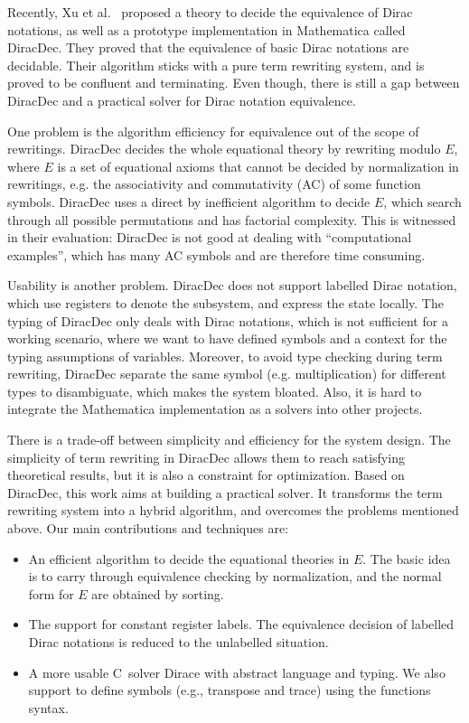 \documentclass[runningheads]{llncs}
\newcommand{\CC}{C\nolinebreak\hspace{-.05em}\raisebox{.4ex}{\tiny\bf +}\nolinebreak\hspace{-.10em}\raisebox{.4ex}{\tiny\bf +}}
\def\CC{{C\nolinebreak[4]\hspace{-.05em}\raisebox{.4ex}{\tiny\bf ++}}}
\begin{document}
Recently, Xu et al.~\cite{diracdec} proposed a theory to decide the equivalence of Dirac notations, as well as a prototype implementation in Mathematica called DiracDec.
They proved that the equivalence of basic Dirac notations are decidable.
Their algorithm sticks with a pure term rewriting system, and is proved to be confluent and terminating.
Even though, there is still a gap between DiracDec and a practical solver for Dirac notation equivalence.

One problem is the algorithm efficiency for equivalence out of the scope of rewritings. DiracDec decides the whole equational theory by rewriting modulo $E$, where $E$ is a set of equational axioms that cannot be decided by normalization in rewritings, e.g. the associativity and commutativity (AC) of some function symbols. DiracDec uses a direct by inefficient algorithm to decide $E$, which search through all possible permutations and has factorial complexity.
This is witnessed in their evaluation: DiracDec is not good at dealing with ``computational examples'', which has many AC symbols and are therefore time consuming.

Usability is another problem.
DiracDec does not support labelled Dirac notation, which use registers to denote the subsystem, and express the state locally.
The typing of DiracDec only deals with Dirac notations, which is not sufficient for a working scenario, where we want to have defined symbols and a context for the typing assumptions of variables.
Moreover, to avoid type checking during term rewriting, DiracDec separate the same symbol (e.g. multiplication) for different types to disambiguate, which makes the system bloated.
Also, it is hard to integrate the Mathematica implementation as a solvers into other projects.

There is a trade-off between simplicity and efficiency for the system design. The simplicity of term rewriting in DiracDec allows them to reach satisfying theoretical results, but it is also a constraint for optimization.
Based on DiracDec, this work aims at building a practical solver. It transforms the term rewriting system into a hybrid algorithm, and overcomes the problems mentioned above. Our main contributions and techniques are:
\begin{itemize}
    \item An efficient algorithm to decide the equational theories in $E$. The basic idea is to carry through equivalence checking by normalization, and the normal form for $E$ are obtained by sorting. %
    \item The support for constant register labels. The equivalence decision of labelled Dirac notations is reduced to the unlabelled situation.
    \item A more usable \CC\ solver Dirace with abstract language and typing. We also support to define symbols (e.g., transpose and trace) using the functions syntax.
\end{itemize}
\end{document}
